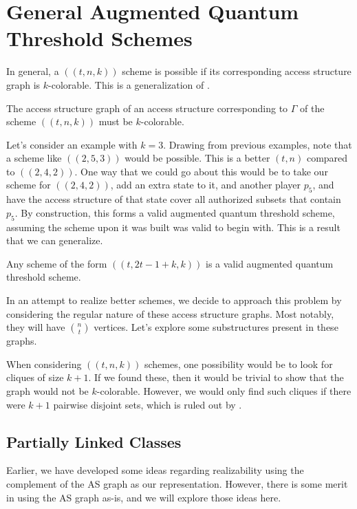 \chapter{General Augmented Quantum Threshold Schemes}
\label{ch4}

In general, a $((t,n,k))$ scheme is possible if its corresponding access structure graph is $k$-colorable. This is a generalization of .

\begin{theorem}
    \label{thm:k-color-access}
    The access structure graph of an access structure corresponding to $\Gamma$ of the scheme $((t,n,k))$ must be $k$-colorable.
\end{theorem}

Let's consider an example with $k=3$. Drawing from previous examples, note that a scheme like $((2,5,3))$ would be possible. This is a better $(t,n)$ compared to $((2,4,2))$. One way that we could go about this would be to take our scheme for $((2,4,2))$, add an extra state to it, and another player $p_5$, and have the access structure of that state cover all authorized subsets that contain $p_5$. By construction, this forms a valid augmented quantum threshold scheme, assuming the scheme upon it was built was valid to begin with. This is a result that we can generalize.

\begin{theorem}
    \label{} 
    Any scheme of the form $((t,2t-1+k,k))$ is a valid augmented quantum threshold scheme.
\end{theorem}

In an attempt to realize better schemes, we decide to approach this problem by considering the regular nature of these access structure graphs. Most notably, they will have $\binom{n}{t}$ vertices. Let's explore some substructures present in these graphs.

When considering $((t,n,k))$ schemes, one possibility would be to look for cliques of size $k+1$. If we found these, then it would be trivial to show that the graph would not be $k$-colorable. However, we would only find such cliques if there were $k+1$ pairwise disjoint sets, which is ruled out by . 

\section{Partially Linked Classes}

Earlier, we have developed some ideas regarding realizability using the complement of the AS graph as our representation. However, there is some merit in using the AS graph as-is, and we will explore those ideas here.

